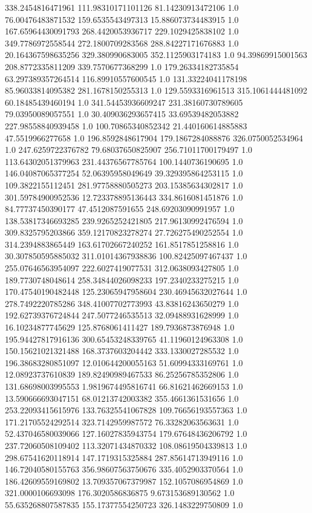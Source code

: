 338.2454816471961	111.98310171101126	81.14230913472106	1.0
76.00476483871532	159.6535543497313	15.886073734483915	1.0
167.65964430091793	268.4420053936717	229.1029425838102	1.0
349.7786972558544	272.1800709283568	288.84227171676883	1.0
20.164367598635256	329.380990683005	352.1125903174183	1.0
94.39869915001563	208.8772335811209	339.7570677368299	1.0
179.26334182735854	63.297389357264514	116.89910557600545	1.0
131.33224041178198	85.96033814095382	281.1678150255313	1.0
129.5593316961513	315.1061444481092	60.18485439460194	1.0
341.54453936609247	231.38160730789605	79.03950089057551	1.0
30.409036293657415	33.69539482053882	227.98558840939458	1.0
100.70865340852342	21.440160614885883	47.5519966277658	1.0
196.8592848617904	179.1867284088876	326.0750052534964	1.0
247.6259722376782	79.68037650825907	256.71011700179497	1.0
113.64302051379963	231.44376567785764	100.1440736190695	1.0
146.04087065377254	52.06395958049649	39.329395864253115	1.0
109.3822155112451	281.97758880505273	203.15385634302817	1.0
301.59784900952536	12.723378895136443	334.8616081451876	1.0
84.77737450390177	47.4512087591655	248.69203090991957	1.0
138.53817346693285	239.9265252421805	217.96130992476594	1.0
309.8325795203866	359.12170823278274	27.726275490252554	1.0
314.2394883865449	163.61702667240252	161.8517851258816	1.0
30.307850595885032	311.01014367938836	100.82425097467437	1.0
255.07646563954097	222.6027419077531	312.0638093427805	1.0
189.7730748048614	258.34844026098233	197.2340233275215	1.0
170.47540190482448	125.23065947958604	230.46945632027644	1.0
278.7492220785286	348.41007702773993	43.83816243650279	1.0
192.62739376724844	247.5077246535513	32.09488931628999	1.0
16.10234877745629	125.8768061411427	189.7936873876948	1.0
195.94427817916136	300.65453248339765	41.11960124963308	1.0
150.15621021321488	168.3737603204442	333.1330027285532	1.0
196.38683280851097	12.010644200055163	51.60994333169761	1.0
12.08923737610839	189.82490989467533	86.25256785352806	1.0
131.68698003995553	1.9819674495816741	66.81621462669153	1.0
13.590666693047151	68.01213742003382	355.4661361531656	1.0
253.22093415615976	133.76325541067828	109.76656193557363	1.0
171.21705524292514	323.7142959987572	76.33282063563631	1.0
52.437046580039066	127.16027835943754	179.67648436206792	1.0
237.72060508109402	113.32071434870332	108.08619504339813	1.0
298.67541620118914	147.1719315325884	287.85614713949116	1.0
146.72040580155763	356.98607563750676	335.4052903370564	1.0
186.42609559169802	13.709357067379987	152.1057086954869	1.0
321.0000106693098	176.3020586836875	9.673153689130562	1.0
55.635268807587835	155.17377554250723	326.1483229750809	1.0
